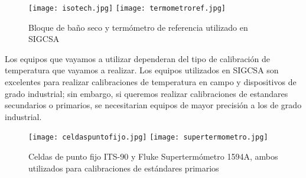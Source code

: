 		\begin{figure}[h]
			\centering
			\texttt{[image: isotech.jpg]}
			\texttt{[image: termometroref.jpg]}
			\caption{Bloque de baño seco y termómetro de referencia utilizado en SIGCSA}
		\end{figure}
	
		\par \noindent
			Los equipos que vayamos a utilizar dependeran del tipo de calibración de temperatura que vayamos a realizar. Los equipos utilizados en SIGCSA son excelentes para realizar calibraciones de temperatura en campo y dispositivos de grado industrial; sin embargo, si queremos realizar calibraciones de estandares secundarios o primarios, se necesitarian equipos de mayor precisión a los de grado industrial.
			
		\begin{figure}[h]
			\centering
			\texttt{[image: celdaspuntofijo.jpg]}
			\texttt{[image: supertermometro.jpg]}
			\caption{Celdas de punto fijo ITS-90 y Fluke Supertermómetro 1594A, ambos utilizados para calibraciones de estándares primarios}
		\end{figure}